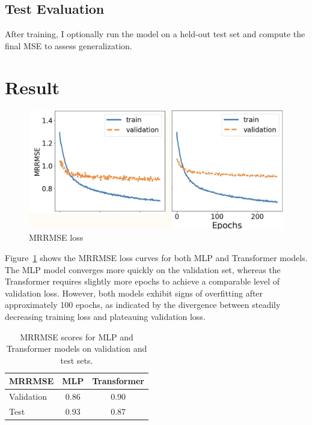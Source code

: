\documentclass[11pt, oneside]{article}   	%
\begin{document}
\subsection*{Test Evaluation}

After training, I optionally run the model on a held-out test set and compute the final MSE to assess generalization. 





\section*{Result}

\begin{figure}[htbp]
  \centering
  \includegraphics[width=1.0 \textwidth]{training.png}
  \caption{MRRMSE loss}
  \label{fig:training}
\end{figure}


Figure~\ref{fig:training} shows the MRRMSE loss curves for both MLP and Transformer models. The MLP model converges more quickly on the validation set, whereas the Transformer requires slightly more epochs to achieve a comparable level of validation loss. However, both models exhibit signs of overfitting after approximately 100 epochs, as indicated by the divergence between steadily decreasing training loss and plateauing validation loss.


\begin{table}[htbp]
\centering
\begin{tabular}{|l|c|c|}
\hline
\textbf{MRRMSE} & \textbf{MLP} & \textbf{Transformer} \\
\hline
Validation & 0.86 & 0.90 \\
\hline
Test       & 0.93 & 0.87 \\
\hline
\end{tabular}
\caption{MRRMSE scores for MLP and Transformer models on validation and test sets.}
\label{tab:mrrmse_results}
\end{table}
\end{document}
